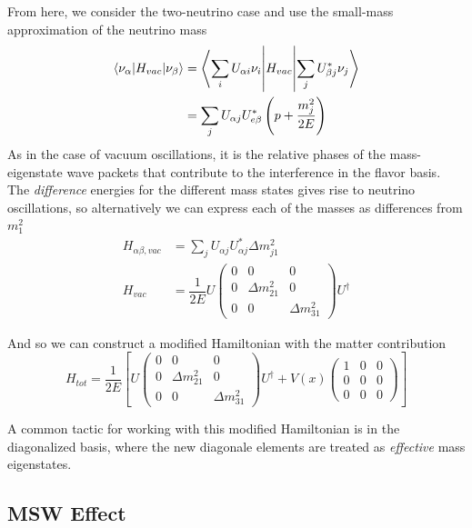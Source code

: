 \documentclass[main.tex]{subfiles}
\begin{document}
From here, we consider the two-neutrino case and use the small-mass approximation of the neutrino mass
\begin{align} 
    \left< \nu_{\alpha} | H_{vac} | \nu_{\beta}  \right> &= \left<  \sum_{i} U_{\alpha i} \nu_{i} \middle| H_{vac} \middle| \sum_{j} U_{\beta j}^{*}\nu_{j} \right>  \\
    &=  \sum\limits_{j} U_{\alpha j} U^{*}_{e\beta}\left( p + \dfrac{m_{j}^{2}}{2E} \right)
\end{align}
As in the case of vacuum oscillations, it is the relative phases of the mass-eigenstate wave packets that contribute to the interference in the flavor basis. 
The \textit{difference} energies for the different mass states gives rise to neutrino oscillations, so alternatively we can express each of the masses as differences from $m_{1}^{2}$ 
\begin{align}
    H_{\alpha \beta, vac } &= \sum\limits_{j} U_{\alpha j} U^{*}_{\alpha j} \Delta m^{2}_{j1}\\
    H_{vac }&= \dfrac{1}{2E} U\left(\begin{array}{ccc} 0 & 0 & 0 \\ 0 & \Delta m_{21}^{2} & 0 \\ 0 & 0 & \Delta m_{31}^{2} \end{array}\right)U^{\dag} \label{eq:hamy}
\end{align}

And so we can construct a modified Hamiltonian with the matter contribution 
\begin{equation}
    H_{tot }= \dfrac{1}{2E} \left[ U\left(\begin{array}{ccc} 0 & 0 & 0 \\ 0 & \Delta m_{21}^{2} & 0 \\ 0 & 0 & \Delta m_{31}^{2} \end{array}\right)U^{\dag} + V(x)\left(\begin{array}{ccc} 1&0&0\\0&0&0 \\0&0&0 \end{array}\right)  \right]
\end{equation}

A common tactic for working with this modified Hamiltonian is in the diagonalized basis, where the new diagonale elements are treated as \textit{effective} mass eigenstates. 


\subsection{MSW Effect}
\end{document}
